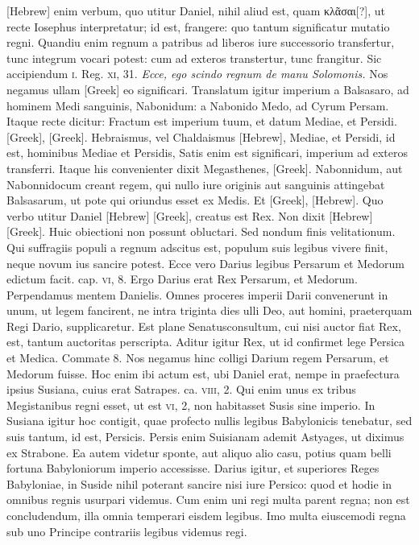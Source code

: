 \texthebrew{[Hebrew]} enim verbum, quo utitur Daniel,
 nihil aliud est, quam
\textgreek{κλᾶσαι[?]}, ut recte Iosephus interpretatur;
 id est, frangere: quo tantum
significatur mutatio regni.
Quandiu enim regnum a patribus
ad liberos iure successorio transfertur, tunc integrum vocari potest:
cum ad exteros transtertur, tunc frangitur.
Sic accipiendum \textsc{i}.
Reg. \textsc{xi}, 31.
\textit{Ecce, ego scindo regnum  de manu Solomonis.}
Nos negamus ullam \textgreek{[Greek]} eo significari.
Translatum igitur imperium
a Balsasaro, ad hominem Medi sanguinis, Nabonidum: a Nabonido
Medo, ad Cyrum Persam.
Itaque recte dicitur: Fractum est
imperium tuum, et datum Mediae, et Persidi.
\textgreek{[Greek]},
\textgreek{[Greek]}.
Hebraismus, vel Chaldaismus
\texthebrew{[Hebrew]}, Mediae, et Persidi, id est, hominibus Mediae et Persidis,
Satis enim est significari, imperium ad exteros transferri.
Itaque his convenienter
dixit Megasthenes, \textgreek{[Greek]}.
Nabonnidum, aut Nabonnidocum creant regem, qui
nullo iure originis aut sanguinis attingebat Balsasarum, ut pote qui
oriundus esset ex Medis.
Et \textgreek{[Greek]}, \texthebrew{[Hebrew]}.
Quo verbo utitur
Daniel \texthebrew{[Hebrew]} \textgreek{[Greek]}, creatus est Rex.
Non dixit \texthebrew{[Hebrew]} \textgreek{[Greek]}.
Huic obiectioni non possunt obluctari.
Sed nondum
finis velitationum.
Qui suffragiis populi a regnum adscitus est,
populum suis legibus vivere finit, neque novum ius sancire potest.
Ecce vero Darius legibus Persarum et Medorum edictum facit.
cap. \textsc{vi}, 8.
Ergo Darius erat Rex Persarum, et Medorum.
Perpendamus
mentem Danielis.
Omnes proceres imperii Darii convenerunt
in unum, ut legem fancirent, ne intra triginta dies ulli
Deo, aut homini, praeterquam Regi Dario, supplicaretur.
Est plane
Senatusconsultum, cui nisi auctor fiat Rex, est, tantum auctoritas
perscripta.
Aditur igitur Rex, ut id confirmet lege Persica et
Medica.
Commate 8.
Nos negamus hinc colligi Darium regem
Persarum, et Medorum fuisse.
Hoc enim ibi actum est, ubi Daniel
erat, nempe in praefectura ipsius Susiana, cuius erat Satrapes.
ca. \textsc{viii}, 2.
Qui enim unus ex tribus Megistanibus regni esset, ut est
\textsc{vi}, 2, non habitasset Susis sine imperio.
In Susiana igitur hoc contigit,
quae profecto nullis legibus Babylonicis tenebatur, sed suis
tantum, id est, Persicis.
Persis enim Suisianam ademit Astyages, ut
diximus ex Strabone.
Ea autem videtur sponte, aut aliquo alio casu,
potius quam belli fortuna Babyloniorum imperio accessisse.
Darius igitur, et superiores Reges Babyloniae, in Suside nihil poterant
sancire nisi iure Persico: quod et hodie in omnibus regnis usurpari
videmus.
Cum enim uni regi multa parent regna; non est concludendum,
illa omnia temperari eisdem legibus.
{}
Imo multa eiuscemodi regna sub uno Principe contrariis legibus videmus regi.

